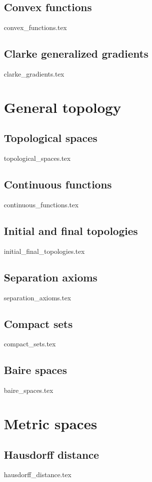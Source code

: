 \documentclass[numbers=endperiod, bibliography=totocnumbered]{scrartcl}
\begin{document}
\subsection{Convex functions}\label{sec:convex_functions}
{convex_functions.tex}
\subsection{Clarke generalized gradients}\label{sec:clarke_gradients}
{clarke_gradients.tex}

\section{General topology}\label{sec:general_topology}
\subsection{Topological spaces}\label{sec:topological_spaces}
{topological_spaces.tex}
\subsection{Continuous functions}\label{sec:continuous_functions}
{continuous_functions.tex}
\subsection{Initial and final topologies}\label{sec:initial_final_topologies}
{initial_final_topologies.tex}
\subsection{Separation axioms}\label{sec:separation_axioms}
{separation_axioms.tex}
\subsection{Compact sets}\label{sec:compact_sets}
{compact_sets.tex}
\subsection{Baire spaces}\label{sec:baire_spaces}
{baire_spaces.tex}

\section{Metric spaces}\label{sec:metric_spaces}
\subsection{Hausdorff distance}\label{sec:hausdorff_distance}
{hausdorff_distance.tex}
\end{document}
